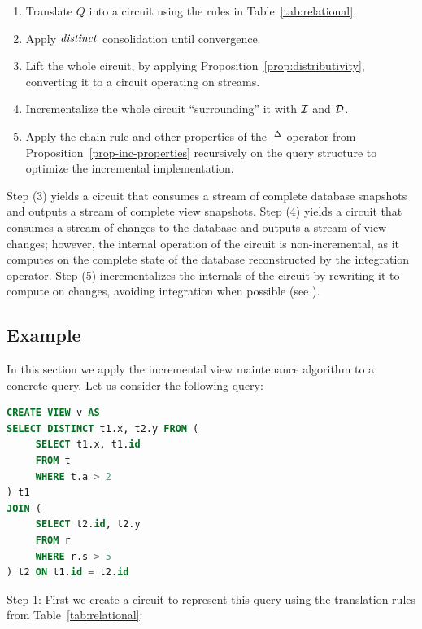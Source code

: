 \begin{algorithm}\label{algorithm-inc}\quad
\begin{enumerate}[nosep, leftmargin=\parindent]
    \item Translate $Q$ into a circuit using the rules in Table~\ref{tab:relational}.
    \item Apply $\mathit{distinct}$ consolidation until convergence.
    \item Lift the whole circuit, by applying Proposition~\ref{prop:distributivity},
    converting it to a circuit operating on streams.
    \item Incrementalize the whole circuit ``surrounding'' it with $\mathcal{I}$ and $\mathcal{D}$.
    \item Apply the chain rule and other properties of the ${\cdot}^{\Delta}$ operator
    from Proposition~\ref{prop-inc-properties} recursively on the query structure
    to optimize the incremental implementation.  
\end{enumerate}
\end{algorithm}

Step (3) yields a circuit that consumes a stream of complete database snapshots and outputs a 
stream of complete view snapshots. Step (4) yields a circuit that consumes a stream of changes
to the database and outputs a stream of view changes; however, the internal operation of the 
circuit is non-incremental, as it computes on the complete state of the database reconstructed
by the integration operator.  Step (5) incrementalizes the internals of the circuit by rewriting 
it to compute on changes, avoiding integration when possible (see ).  

\subsection{Example}\label{sec:relational-example}

In this section we apply the incremental view maintenance algorithm to a concrete
query.  Let us consider the following query:

\begin{lstlisting}[language=SQL]
CREATE VIEW v AS
SELECT DISTINCT t1.x, t2.y FROM (
     SELECT t1.x, t1.id 
     FROM t 
     WHERE t.a > 2 
) t1  
JOIN (
     SELECT t2.id, t2.y
     FROM r 
     WHERE r.s > 5 
) t2 ON t1.id = t2.id
\end{lstlisting}

Step 1: First we create a \dbsp circuit to represent this query using the
translation rules from Table~\ref{tab:relational}:

